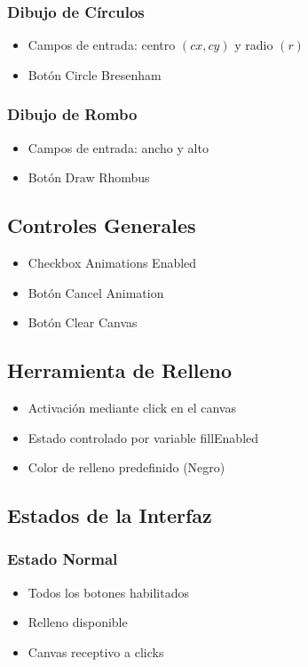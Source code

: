 \documentclass[12pt]{article}
\begin{document}
\subsubsection{Dibujo de Círculos}
\begin{itemize}
    \item Campos de entrada: centro $(cx,cy)$ y radio $(r)$
    \item Botón Circle Bresenham
\end{itemize}

\subsubsection{Dibujo de Rombo}
\begin{itemize}
    \item Campos de entrada: ancho y alto
    \item Botón Draw Rhombus
\end{itemize}

\subsection{Controles Generales}
\begin{itemize}
    \item Checkbox Animations Enabled
    \item Botón Cancel Animation
    \item Botón Clear Canvas
\end{itemize}

\subsection{Herramienta de Relleno}
\begin{itemize}
    \item Activación mediante click en el canvas
    \item Estado controlado por variable fillEnabled
    \item Color de relleno predefinido (Negro)
\end{itemize}

\subsection{Estados de la Interfaz}
\subsubsection{Estado Normal}
\begin{itemize}
    \item Todos los botones habilitados
    \item Relleno disponible
    \item Canvas receptivo a clicks
\end{itemize}
\end{document}
